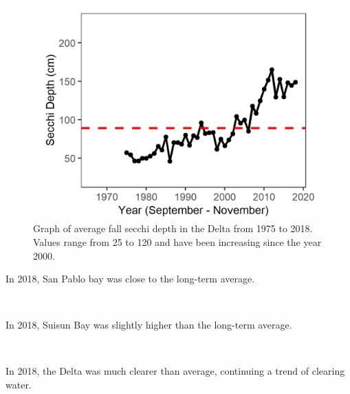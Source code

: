 \documentclass[
]{book}
\begin{document}
\begin{panel-grid}
\begin{columns-nocenter}
\begin{column800}
\begin{expand}
\begin{figure}
\includegraphics[width=15.25in]{figures/secchi_dtfall} \caption{Graph of average fall secchi depth in the Delta from 1975 to 2018. Values range from 25 to 120 and have been increasing since the year 2000.}\label{fig:unnamed-chunk-98}
\end{figure}

\end{expand}

\end{column800}

\end{columns-nocenter}

\begin{columns-nocenter}

\begin{column800}

In 2018, San Pablo bay was close to the long-term average.

\end{column800}

\begin{column40}

~

\end{column40}

\begin{column800}

In 2018, Suisun Bay was slightly higher than the long-term average.

\end{column800}

\begin{column40}

~

\end{column40}

\begin{column800}

In 2018, the Delta was much clearer than average, continuing a trend of clearing water.

\end{column800}

\end{columns-nocenter}

\end{panel-grid}
\end{document}
